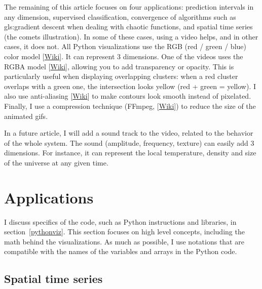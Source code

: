 \documentclass[oneside,10pt]{book}
\begin{document}
The remaining of this article focuses on four applications: prediction intervals in any dimension, supervised classification, convergence of algorithms such as \gls{gls:gradient} descent when dealing with chaotic functions, and spatial time series (the comets illustration). In some of these cases, using a video helps, and in other cases, it does not. All Python visualizations use the \textcolor{index}{RGB} (red / green / blue) color model [\href{https://en.wikipedia.org/wiki/RGB_color_model}{Wiki}]. It can represent 3 dimensions.
One of the videos uses the \textcolor{index}{RGBA} model [\href{https://en.wikipedia.org/wiki/RGBA_color_model}{Wiki}], allowing you to
add transparency or opacity. This is particularly useful when displaying overlapping clusters: when a red cluster overlaps with a green one, the intersection looks yellow (red + green = yellow).
I also use
\textcolor{index}{anti-aliasing}
 [\href{https://en.wikipedia.org/wiki/Anti-aliasing}{Wiki}] to make contours look smooth instead of pixelated. Finally, I use a compression technique (\textcolor{index}{FFmpeg}, [\href{https://en.wikipedia.org/wiki/FFmpeg}{Wiki}]) to reduce the size of the animated gifs.

In a future article, I will add a sound track to the video, related to the behavior of the whole system. The sound (amplitude, frequency, texture) can easily add 3 dimensions. For instance, it can represent the local temperature, density and size of the universe at any given time.

\section{Applications}

I discuss specifics of the code, such as Python instructions and libraries, in section~\ref{pythonviz}. This section focuses on high level concepts, including the math behind the visualizations. As much as possible, I use notations that are compatible with the names of the variables and arrays in the Python code.

\subsection{Spatial time series}\label{ellipser}
\end{document}
